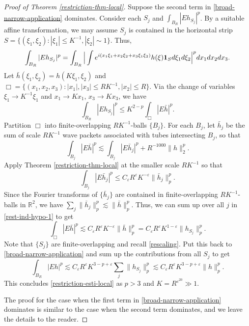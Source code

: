 \documentclass{amsart}%
\numberwithin{equation}{section}
\newcommand{\e}{\varepsilon}
\newcommand{\ZR}{\mathbb{R}}
\newcommand{\Id}{{\bf{1}}}
\newcommand{\1}{\mathbbm{1}}
\begin{document}
\begin{proof}[Proof of Theorem \ref{restriction-thm-local}]
	\medskip
	
	Suppose the second term in \eqref{broad-narrow-application} dominates.
	Consider each $S_j$ and $\int_{B_R}|Eh_{S_j}|^p$.
	By a suitable affine transformation, we may assume $S_j$ is contained in the horizontal strip $S=\{(\xi_1,\xi_2):|\xi_1|\leq K^{-1}, |\xi_2|\sim1\}$.
	Thus,
	\begin{equation}
		\nonumber
		\int_{B_R}|Eh_{S_j}|^p=\int_{B_R}\Big|\int e^{i(x_1\xi_1+x_2\xi_2+x_3\xi_1\xi_2)}h(\xi)\Id_{S}d\xi_1d\xi_2\Big|^pdx_1dx_2dx_3.
	\end{equation}
	Let $\bar h(\xi_1,\xi_2)=h(K\xi_1,\xi_2)$ and $\Box=\{(x_1,x_2,x_3):|x_1|, |x_3|\leq RK^{-1}, |x_2|\leq R\}$.
	Via the change of variables $\xi_1\to K^{-1}\xi_1$ and $x_1\to Kx_1$, $x_3\to Kx_3$, we have
	\begin{equation}
		\label{rescaling}
		\int_{B_R}|Eh_{S_j}|^p\leq K^{2-p}\int_{\Box}|E\bar h|^p.
	\end{equation}
	Partition $\Box$ into finite-overlapping $RK^{-1}$-balls $\{B_j\}$.
	For each $B_j$, let $\bar h_j$ be the sum of scale $RK^{-1}$ wave packets associated with tubes intersecting $B_j$, so that
	\begin{equation}
		\nonumber
		\int_{B_j}|E\bar h|^p\lesssim\int_{B_j}|E\bar h_j|^p+R^{-1000}\|h\|_2^p.
	\end{equation}
	Apply Theorem \ref{restriction-thm-local} at the smaller scale $RK^{-1}$ so that
	\begin{equation}
		\label{rest-ind-hypo-1}
		\int_{B_j}|E\bar h_j|^p\leq C_\e R^\e K^{-\e}\|\bar h_j\|_p^p.
	\end{equation}
	Since the  Fourier transforms of $\{\bar h_j\}$ are contained in finite-overlapping $RK^{-1}$-balls in $\ZR^2$, we have $\sum_j\|\bar h_j\|_p^p\lesssim \|\bar h\|_p^p$.
	Thus, we can sum up over all $j$ in \eqref{rest-ind-hypo-1} to get
	\begin{equation}
		\nonumber
		\int_{\Box}|E\bar h|^p\lesssim C_\e R^\e K^{-\e}\|\bar h\|_p^p= C_\e R^{\e}K^{1-\e}\| h_{S_j}\|_p^p.
	\end{equation}
	Note that $\{S_j\}$ are finite-overlapping and recall \eqref{rescaling}. 
	Put this back to \eqref{broad-narrow-application} and sum up the contributions from all $S_j$ to get
	\begin{equation}
	\nonumber
		\int_{B_R}|Eh|^p\lesssim C_\e R^{\e} K^{3-p+\e}\sum_j\|h_{S_j}\|_p^p\lesssim C_\e R^{\e} K^{3-p+\e}\|h\|_p^p.
	\end{equation}
	This concludes \eqref{restriction-esti-local} as $p>3$ and $K=R^{\e^{20}}\gg 1$.
	
	\smallskip
	
	The proof for the case when the first term in \eqref{broad-narrow-application} dominates is similar to the case when the second term dominates, and we leave the details to the reader. \qedhere
	
	
\end{proof}


\bigskip




\end{document}
